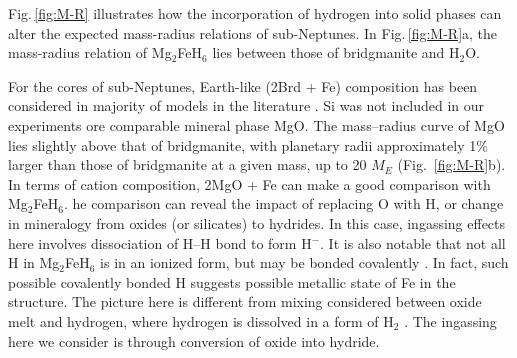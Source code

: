 \documentclass[draft,jgrga,12pt]{agujournal2019}
\begin{document}


Fig.\,\ref{fig:M-R} illustrates how the incorporation of hydrogen into solid phases can alter the expected mass-radius relations of sub-Neptunes. 
In Fig.\,\ref{fig:M-R}a, the mass-radius relation of Mg$_2$FeH$_6$ lies between those of bridgmanite and H$_2$O.

For the cores of sub-Neptunes, Earth-like (2Brd + Fe) composition has been considered in majority of models in the literature \cite{valencia_internal_2006, sotin_mass_2007, zeng_detailed_2013}.
Si was not included in our experiments ore comparable mineral phase  MgO.
The mass–radius curve of MgO lies slightly above that of bridgmanite, with planetary radii approximately 1\% larger than those of bridgmanite at a given mass, up to 20 $M_E$ (Fig.~\ref{fig:M-R}b).
In terms of cation composition, 2MgO + Fe can make a good comparison with Mg$_2$FeH$_6$.
he comparison can  reveal the impact of replacing O with H, or change in mineralogy from oxides (or silicates) to hydrides.
In this case, ingassing effects here involves dissociation of H--H bond to form H$^{-}$.  
It is also notable that not all H in Mg$_2$FeH$_6$ is in an ionized form, but may be bonded covalently \cite{retuerto_neutron_2015}.
In fact, such possible covalently bonded H suggests possible metallic state of Fe in the structure.
The picture here is different from mixing considered between oxide melt and hydrogen, where hydrogen is dissolved in a form of H$_2$ \cite{gilmore_core_2026}.
The ingassing here we consider is through conversion of oxide into hydride.
\end{document}
